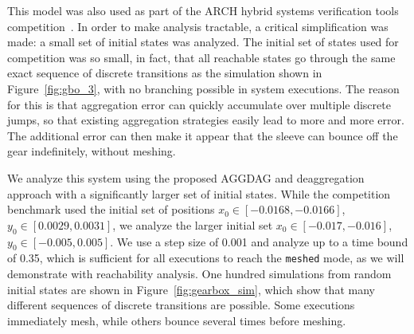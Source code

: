 This model was also used as part of the ARCH hybrid systems verification tools competition~\cite{archcomp19}.
%
In order to make analysis tractable, a critical simplification was made: a small set of initial states was analyzed.
%
The initial set of states used for competition was so small, in fact, that all reachable states go through the
same exact sequence of discrete transitions as the simulation shown in Figure~\ref{fig:gbo_3}, with no branching possible in system executions.
%
The reason for this is that aggregation error can quickly accumulate over multiple discrete jumps, so that existing aggregation strategies
easily lead to more and more error.
%
The additional error can then make it appear that the sleeve can bounce off the gear indefinitely, without meshing.

We analyze this system using the proposed AGGDAG and deaggregation approach with a significantly larger set of initial states.
%
While the competition benchmark used the initial set of positions $x_0 \in [-0.0168, -0.0166]$, $y_0 \in [0.0029, 0.0031]$, we
analyze the larger initial set $x_0 \in [-0.017, -0.016]$, $y_0 \in [-0.005, 0.005]$.
%
We use a step size of 0.001 and analyze up to a time bound of 0.35, which is sufficient for all executions to reach the \texttt{meshed} mode,
as we will demonstrate with reachability analysis.
%
One hundred simulations from random initial states are shown in Figure~\ref{fig:gearbox_sim}, which show that many different
sequences of discrete transitions are possible. Some executions immediately mesh, while others bounce several times before meshing.

